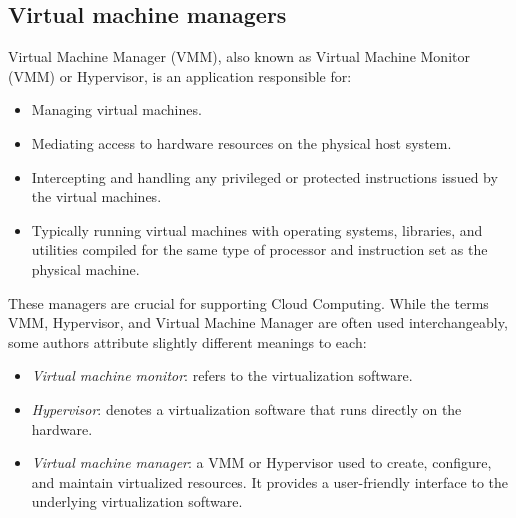 \subsection{Virtual machine managers}
Virtual Machine Manager (VMM), also known as Virtual Machine Monitor (VMM) or Hypervisor, is an application responsible for:
\begin{itemize}
    \item Managing virtual machines.
    \item Mediating access to hardware resources on the physical host system.
    \item Intercepting and handling any privileged or protected instructions issued by the virtual machines.
    \item Typically running virtual machines with operating systems, libraries, and utilities compiled for the same type of processor and instruction set as the physical machine.
\end{itemize}
These managers are crucial for supporting Cloud Computing. 
While the terms VMM, Hypervisor, and Virtual Machine Manager are often used interchangeably, some authors attribute slightly different meanings to each:
\begin{itemize}
    \item \textit{Virtual machine monitor}: refers to the virtualization software.
    \item \textit{Hypervisor}: denotes a virtualization software that runs directly on the hardware.
    \item \textit{Virtual machine manager}: a VMM or Hypervisor used to create, configure, and maintain virtualized resources. 
        It provides a user-friendly interface to the underlying virtualization software.
\end{itemize}
